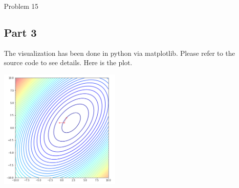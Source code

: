 \documentclass[10pt]{article}
\begin{document}
\begin{section}{Problem 15}
	\subsection{Part 3}
	The visualization has been done in python via matplotlib. Please refer to the source code to see details. Here is the plot. 

	\includegraphics[width=6cm]{img/problem15_plt1.png}


\end{section}
\end{document}
